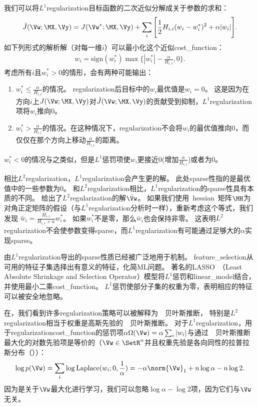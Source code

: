 我们可以将$L^1$\gls{regularization}目标函数的二次近似分解成关于参数的求和：
\begin{align}
 \hat J(\Vw; \MX, \Vy) = J(\Vw^*; \MX, \Vy) + \sum_i \Bigg [\frac{1}{2} H_{i,i} (w_i - w_i^*)^2 
 + \alpha |w_i| \Bigg].  %
\end{align}
如下列形式的解析解（对每一维$i$）可以最小化这个近似\gls{cost_function}：
\begin{align}
w_i = \text{sign}(w_i^*) \max\Big\{ |w_i^*| - \frac{\alpha}{H_{i,i}} , 0\Big\} .
\end{align}
考虑所有$i$且$w_i^* > 0$的情形，会有两种可能输出：
\begin{enumerate}
\item $w_i^* \leq \frac{\alpha}{H_{i,i}}$的情况。
\gls{regularization}后目标中的$w_i$最优值是$w_i = 0$。
这是因为在方向$i$上$J(\Vw; \MX, \Vy) $对$ \hat J(\Vw; \MX, \Vy)$的贡献受到抑制，$L^1$\gls{regularization}项将$w_i$推向0。
\item  $w_i^* > \frac{\alpha}{H_{i,i}}$的情况。在这种情况下，\gls{regularization}不会将$w_i$的最优值推向0，而仅仅在那个方向上移动$\frac{\alpha}{H_{i,i}}$的距离。
\end{enumerate}
$w_i^* < 0$的情况与之类似，但是$L^1$惩罚项使$w_i$更接近0(增加$ \frac{\alpha}{H_{i,i}}$)或者为0。

相比$L^2$\gls{regularization}，$L^1$\gls{regularization}会产生更的解。
此处\gls{sparse}性指的是最优值中的一些参数为$0$。
和$L^2$\gls{regularization}相比，$L^1$\gls{regularization}的\gls{sparse}性具有本质的不同。
给出了$L^2$\gls{regularization}的解$\tilde \Vw$。 
如果我们使用~\gls{hessian}~矩阵$\MH$为对角正定矩阵的假设（与$L^1$\gls{regularization}分析时一样），重新考虑这个等式，我们发现
$\tilde{w_i} = \frac{H_{i,i}}{H_{i,i} + \alpha} w_i^*$。
如果$w_i^*$不是零，那么$\tilde{w_i}$也会保持非零。 
这表明$L^2$\gls{regularization}不会使参数变得\gls{sparse}，而$L^1$\gls{regularization}有可能通过足够大的$\alpha$实现\gls{sparse}。
 
由$L^1$\gls{regularization}导出的\gls{sparse}性质已经被广泛地用于机制。
\gls{feature_selection}从可用的特征子集选择出有意义的特征，化简\gls{ML}问题。
著名的LASSO~\citep{Tibshirani-1995}（Least Absolute Shrinkage and
Selection Operator）模型将$L^1$惩罚和\gls{linear_model}结合，并使用最小二乘\gls{cost_function}。 
$L^1$惩罚使部分子集的权重为零，表明相应的特征可以被安全地忽略。
 
在，我们看到许多\gls{regularization}策略可以被解释为~~贝叶斯推断，
特别是$L^2$\gls{regularization}相当于权重是高斯先验的~~贝叶斯推断。
对于$L^1$\gls{regularization}，用于\gls{regularization}\gls{cost_function}的惩罚项$\alpha \Omega(\Vw) =  \alpha \sum_i |w_i |$与通过~~贝叶斯推断最大化的对数先验项是等价的（$\Vw \in \SetR^n$并且权重先验是各向同性的拉普拉斯分布（））：
\begin{align}
\log p(\Vw) = \sum_i \log \text{Laplace}(w_i;0,\frac{1}{\alpha}) = 
  -\alpha \norm{\Vw}_1 + n \log \alpha - n \log 2.
\end{align}
因为是关于$\Vw$最大化进行学习，我们可以忽略$\log \alpha - \log 2$项，因为它们与$\Vw$无关。
 
